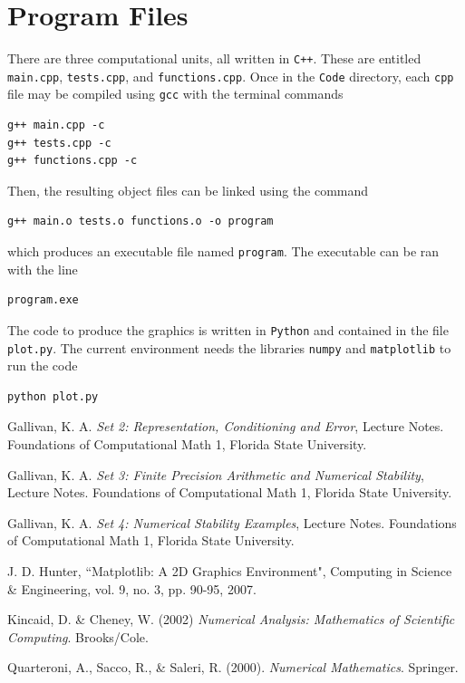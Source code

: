 \documentclass[12pt]{article}
\theoremstyle{definition}
\begin{document}
\section{Program Files}
There are three computational units, all written in \texttt{C++}. These are entitled \texttt{main.cpp}, \texttt{tests.cpp}, and \texttt{functions.cpp}. Once in the \texttt{Code} directory, each \texttt{cpp} file may be compiled using \texttt{gcc} with the terminal commands
\begin{verbatim}
g++ main.cpp -c
g++ tests.cpp -c
g++ functions.cpp -c
\end{verbatim}
Then, the resulting object files can be linked using the command
\begin{verbatim}
g++ main.o tests.o functions.o -o program
\end{verbatim}
which produces an executable file named \texttt{program}. The executable can be ran with the line
\begin{verbatim}
program.exe
\end{verbatim}
The code to produce the graphics is written in \texttt{Python} and contained in the file \texttt{plot.py}. The current environment needs the libraries \texttt{numpy} and \texttt{matplotlib} to run the code
\begin{verbatim}
python plot.py
\end{verbatim}

\newpage 
\begin{thebibliography}{9}
Gallivan, K. A. \textit{Set 2: Representation, Conditioning and Error}, Lecture Notes. Foundations of Computational Math 1, Florida State University.

Gallivan, K. A. \textit{Set 3: Finite Precision Arithmetic and Numerical
Stability}, Lecture Notes. Foundations of Computational Math 1, Florida State University.

Gallivan, K. A. \textit{Set 4: Numerical Stability Examples}, Lecture Notes. Foundations of Computational Math 1, Florida State University.

J. D. Hunter, ``Matplotlib: A 2D Graphics Environment", Computing in Science \& Engineering, vol. 9, no. 3, pp. 90-95, 2007.

Kincaid, D. \& Cheney, W. (2002) \textit{Numerical Analysis: Mathematics of Scientific Computing}. Brooks/Cole.

Quarteroni, A., Sacco, R., \& Saleri, R. (2000). \textit{Numerical Mathematics}. Springer.
\end{thebibliography}
\end{document}
